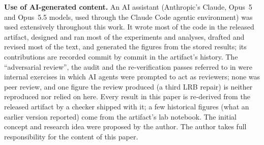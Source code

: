 \documentclass[sigconf, nonacm]{acmart}
\begin{document}
\begin{acks}
\textbf{Use of AI-generated content.} An AI assistant (Anthropic's Claude, Opus~5 and Opus~5.5 models,
used through the Claude Code agentic environment) was used extensively throughout this work. It wrote
most of the code in the released artifact, designed and ran most of the experiments and analyses,
drafted and revised most of the text, and generated the figures from the stored results; its contributions are recorded commit by commit in
the artifact's history. The ``adversarial review'', the audit and the re-verification passes referred to in
 were internal exercises in which AI agents were prompted to act as reviewers; none
was peer review, and one
figure the review produced (a third LRB repair) is neither reproduced nor relied on here. Every result in this paper is
re-derived from the released artifact by a checker shipped with it; a few historical figures (what an
earlier version reported) come from the artifact's lab notebook. The initial concept and research
idea were proposed by the author. The author takes full responsibility for the content of this paper.
\end{acks}



\end{document}

